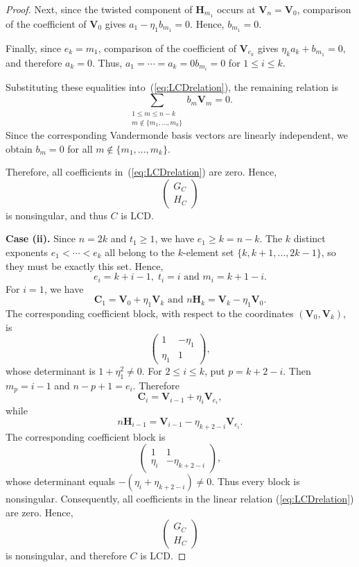 \documentclass[12pt,draftcls,journal,onecolumn]{IEEEtran}
\begin{document}
\begin{proof}
Next, since the twisted component of \(\mathbf{H}_{m_1}\) occurs at
\(\mathbf{V}_n=\mathbf{V}_0\), comparison of the coefficient of
\(\mathbf{V}_0\) gives
\(
a_1-\eta_1b_{m_1}=0.
\)
Hence,
\(
b_{m_1}=0.
\)

Finally, since \(e_k=m_1\), comparison of the coefficient of
\(\mathbf{V}_{e_k}\) gives
\(
\eta_k a_k+b_{m_1}=0,
\)
and therefore
\(
a_k=0.
\)
Thus,
\(
a_1=\cdots=a_k=0
\)\(
b_{m_i}=0
\)
for \(1\le i\le k\).

Substituting these equalities into~(\ref{eq:LCDrelation}), the remaining
relation is
\[
\sum_{\substack{1\le m\le n-k\\
m\notin\{m_1,\ldots,m_k\}}}
b_m\mathbf{V}_m=0.
\]
Since the corresponding Vandermonde basis vectors are linearly
independent, we obtain $b_m=0$ for all \(m\notin\{m_1,\ldots,m_k\}\).

Therefore, all coefficients in~(\ref{eq:LCDrelation}) are zero.
Hence,
\[
\begin{pmatrix}
G_C\\
H_C
\end{pmatrix}
\]
is nonsingular, and thus \(C\) is LCD.

\medskip
\noindent\textbf{Case (ii).}
Since $n=2k$ and $t_1\ge1$, we have $e_1\ge k=n-k$. The $k$ distinct exponents
\(
e_1<\cdots<e_k
\)
all belong to the $k$-element set $\{k,k+1,\ldots,2k-1\}$, so they must be exactly this set. Hence,
\[
e_i = k+i-1,\; t_i = i\text{ and } m_i = k+1-i.
\]
For $i=1$, we have
\[
\mathbf{C}_1=\mathbf{V}_0+\eta_1\mathbf{V}_k\text{ and }
n\mathbf{H}_k=\mathbf{V}_k-\eta_1\mathbf{V}_0.
\]
The corresponding coefficient block, with respect to the coordinates $(\mathbf{V}_0,\mathbf{V}_k)$, is
\[
\begin{pmatrix}
1&-\eta_1\\
\eta_1&1
\end{pmatrix},
\]
whose determinant is
$
1+\eta_1^2\ne0.
$
For $2\le i\le k$, put $p=k+2-i$. Then $m_p=i-1$ and $n-p+1=e_i$. Therefore
\[
\mathbf{C}_i=\mathbf{V}_{i-1}+\eta_i\mathbf{V}_{e_i},
\]
while
\[
n\mathbf{H}_{i-1}=\mathbf{V}_{i-1}-\eta_{k+2-i}\mathbf{V}_{e_i}.
\]
The corresponding coefficient block is
\[
\begin{pmatrix}
1&1\\
\eta_i&-\eta_{k+2-i}
\end{pmatrix},
\]
whose determinant equals
\(
-(\eta_i+\eta_{k+2-i})\ne0.
\)
Thus every block is nonsingular. Consequently, all coefficients in the
linear relation (\ref{eq:LCDrelation}) are zero. Hence,
\[
\begin{pmatrix}
G_C\\
H_C
\end{pmatrix}
\]
is nonsingular, and therefore \(C\) is LCD.


\end{proof}
\end{document}
